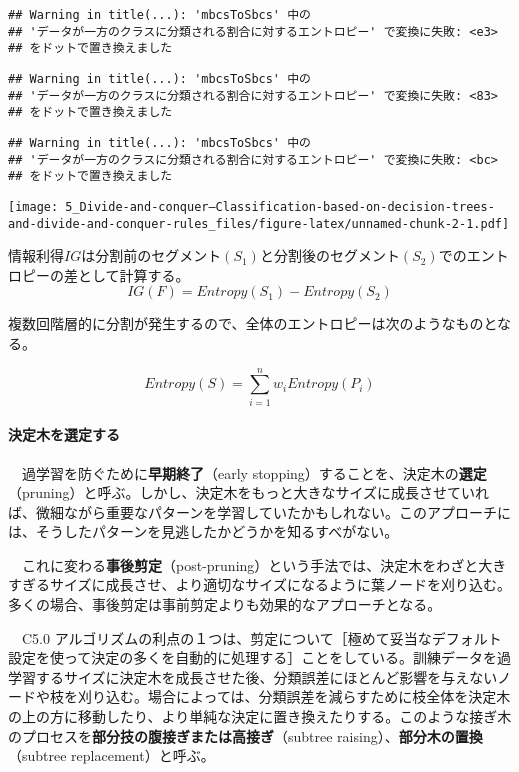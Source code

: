 \documentclass[
]{article}
\begin{document}
\begin{verbatim}
## Warning in title(...): 'mbcsToSbcs' 中の
## 'データが一方のクラスに分類される割合に対するエントロピー' で変換に失敗: <e3>
## をドットで置き換えました
\end{verbatim}

\begin{verbatim}
## Warning in title(...): 'mbcsToSbcs' 中の
## 'データが一方のクラスに分類される割合に対するエントロピー' で変換に失敗: <83>
## をドットで置き換えました
\end{verbatim}

\begin{verbatim}
## Warning in title(...): 'mbcsToSbcs' 中の
## 'データが一方のクラスに分類される割合に対するエントロピー' で変換に失敗: <bc>
## をドットで置き換えました
\end{verbatim}

\texttt{[image: 5\_Divide-and-conquer---Classification-based-on-decision-trees-and-divide-and-conquer-rules\_files/figure-latex/unnamed-chunk-2-1.pdf]}

情報利得\(IG\)は分割前のセグメント\((S_1)\)と分割後のセグメント\((S_2)\)でのエントロピーの差として計算する。\\
\[
IG(F)=Entropy(S_1)-Entropy(S_2)
\]

複数回階層的に分割が発生するので、全体のエントロピーは次のようなものとなる。

\[
Entropy(S)=\sum_{i=1}^{n}w_iEntropy(P_i)
\]

\paragraph{決定木を選定する}\label{ux6c7aux5b9aux6728ux3092ux9078ux5b9aux3059ux308b}

　過学習を防ぐために\textbf{早期終了}（early
stopping）することを、決定木の\textbf{選定}（pruning）と呼ぶ。しかし、決定木をもっと大きなサイズに成長させていれば、微細ながら重要なパターンを学習していたかもしれない。このアプローチには、そうしたパターンを見逃したかどうかを知るすべがない。

　これに変わる\textbf{事後剪定}（post-pruning）という手法では、決定木をわざと大きすぎるサイズに成長させ、より適切なサイズになるように葉ノードを刈り込む。多くの場合、事後剪定は事前剪定よりも効果的なアプローチとなる。

　C5.0
アルゴリズムの利点の１つは、剪定について［極めて妥当なデフォルト設定を使って決定の多くを自動的に処理する］ことをしている。訓練データを過学習するサイズに決定木を成長させた後、分類誤差にほとんど影響を与えないノードや枝を刈り込む。場合によっては、分類誤差を減らすために枝全体を決定木の上の方に移動したり、より単純な決定に置き換えたりする。このような接ぎ木のプロセスを\textbf{部分技の腹接ぎまたは高接ぎ}（subtree
raising）、\textbf{部分木の置換}（subtree replacement）と呼ぶ。
\end{document}
